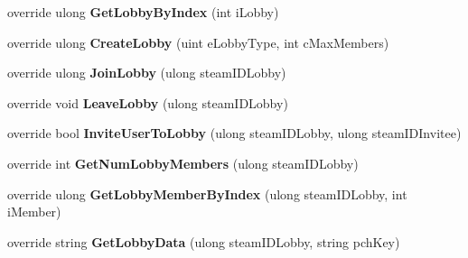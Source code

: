 \begin{DoxyCompactItemize}
\item 
\mbox{\label{class_valve_1_1_steamworks_1_1_c_steam_matchmaking_a315830b2eb4fe823ce9c5bff328755d9}} 
override ulong {\bfseries Get\+Lobby\+By\+Index} (int i\+Lobby)
\item 
\mbox{\label{class_valve_1_1_steamworks_1_1_c_steam_matchmaking_abbd1161d4a0432760151c7a0fad389d6}} 
override ulong {\bfseries Create\+Lobby} (uint e\+Lobby\+Type, int c\+Max\+Members)
\item 
\mbox{\label{class_valve_1_1_steamworks_1_1_c_steam_matchmaking_a94a4e51b76cf834559779343dea50884}} 
override ulong {\bfseries Join\+Lobby} (ulong steam\+I\+D\+Lobby)
\item 
\mbox{\label{class_valve_1_1_steamworks_1_1_c_steam_matchmaking_ade144d76e2c6f2a018669e4c40d964e2}} 
override void {\bfseries Leave\+Lobby} (ulong steam\+I\+D\+Lobby)
\item 
\mbox{\label{class_valve_1_1_steamworks_1_1_c_steam_matchmaking_ab0bda011b5378be07fd8a8f70744d9ee}} 
override bool {\bfseries Invite\+User\+To\+Lobby} (ulong steam\+I\+D\+Lobby, ulong steam\+I\+D\+Invitee)
\item 
\mbox{\label{class_valve_1_1_steamworks_1_1_c_steam_matchmaking_a709e97a62a3fbbcfc9ea2f4cbdfcb95c}} 
override int {\bfseries Get\+Num\+Lobby\+Members} (ulong steam\+I\+D\+Lobby)
\item 
\mbox{\label{class_valve_1_1_steamworks_1_1_c_steam_matchmaking_a59a27dc0e062cfbdb1e6c5f82daa1f0e}} 
override ulong {\bfseries Get\+Lobby\+Member\+By\+Index} (ulong steam\+I\+D\+Lobby, int i\+Member)
\item 
\mbox{\label{class_valve_1_1_steamworks_1_1_c_steam_matchmaking_a86a73b45fa20418bf1fca81e1c73cb43}} 
override string {\bfseries Get\+Lobby\+Data} (ulong steam\+I\+D\+Lobby, string pch\+Key)

\end{DoxyCompactItemize}
